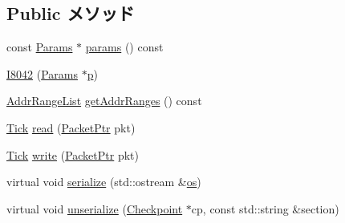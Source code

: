 \subsection*{Public メソッド}
\begin{DoxyCompactItemize}
\item 
const \hyperlink{classX86ISA_1_1I8042_ae70fe038127f3e2a71a81dde45f38dc5}{Params} $\ast$ \hyperlink{classX86ISA_1_1I8042_acd3c3feb78ae7a8f88fe0f110a718dff}{params} () const 
\item 
\hyperlink{classX86ISA_1_1I8042_a46a61113522fbd1946d4f58441b939bf}{I8042} (\hyperlink{classX86ISA_1_1I8042_ae70fe038127f3e2a71a81dde45f38dc5}{Params} $\ast$\hyperlink{namespaceX86ISA_af675c1d542a25b96e11164b80809a856}{p})
\item 
\hyperlink{classstd_1_1list}{AddrRangeList} \hyperlink{classX86ISA_1_1I8042_a36cf113d5e5e091ebddb32306c098fae}{getAddrRanges} () const 
\item 
\hyperlink{base_2types_8hh_a5c8ed81b7d238c9083e1037ba6d61643}{Tick} \hyperlink{classX86ISA_1_1I8042_a613ec7d5e1ec64f8d21fec78ae8e568e}{read} (\hyperlink{classPacket}{PacketPtr} pkt)
\item 
\hyperlink{base_2types_8hh_a5c8ed81b7d238c9083e1037ba6d61643}{Tick} \hyperlink{classX86ISA_1_1I8042_a4cefab464e72b5dd42c003a0a4341802}{write} (\hyperlink{classPacket}{PacketPtr} pkt)
\item 
virtual void \hyperlink{classX86ISA_1_1I8042_a53e036786d17361be4c7320d39c99b84}{serialize} (std::ostream \&\hyperlink{namespaceX86ISA_a6b6e6ba763e7eaf46ac5b6372ca98d30}{os})
\item 
virtual void \hyperlink{classX86ISA_1_1I8042_af22e5d6d660b97db37003ac61ac4ee49}{unserialize} (\hyperlink{classCheckpoint}{Checkpoint} $\ast$cp, const std::string \&section)
\end{DoxyCompactItemize}
